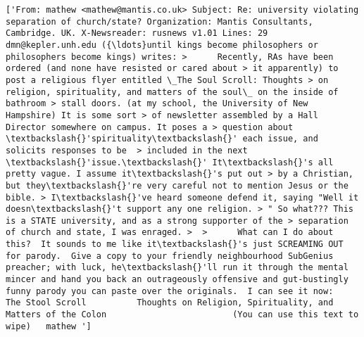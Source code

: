 \documentclass[11pt]{article}
\begin{document}
\begin{Verbatim}[commandchars=\\\{\}]
['From: mathew <mathew@mantis.co.uk> Subject: Re: university violating separation of church/state? Organization: Mantis Consultants, Cambridge. UK. X-Newsreader: rusnews v1.01 Lines: 29  dmn@kepler.unh.edu ({\ldots}until kings become philosophers or philosophers become kings) writes: >      Recently, RAs have been ordered (and none have resisted or cared about > it apparently) to post a religious flyer entitled \_The Soul Scroll: Thoughts > on religion, spirituality, and matters of the soul\_ on the inside of bathroom > stall doors. (at my school, the University of New Hampshire) It is some sort > of newsletter assembled by a Hall Director somewhere on campus. It poses a > question about \textbackslash{}'spirituality\textbackslash{}' each issue, and solicits responses to be  > included in the next \textbackslash{}'issue.\textbackslash{}' It\textbackslash{}'s all pretty vague. I assume it\textbackslash{}'s put out > by a Christian, but they\textbackslash{}'re very careful not to mention Jesus or the bible. > I\textbackslash{}'ve heard someone defend it, saying "Well it doesn\textbackslash{}'t support any one religion. > " So what??? This is a STATE university, and as a strong supporter of the > separation of church and state, I was enraged. >  >      What can I do about this?  It sounds to me like it\textbackslash{}'s just SCREAMING OUT for parody.  Give a copy to your friendly neighbourhood SubGenius preacher; with luck, he\textbackslash{}'ll run it through the mental mincer and hand you back an outrageously offensive and gut-bustingly funny parody you can paste over the originals.  I can see it now:                                 The Stool Scroll          Thoughts on Religion, Spirituality, and Matters of the Colon                         (You can use this text to wipe)   mathew ']

\end{Verbatim}
\end{document}
